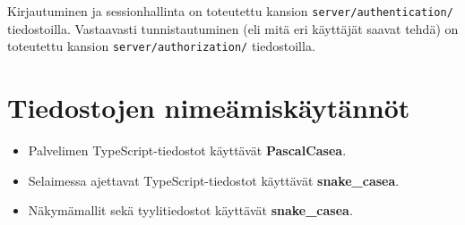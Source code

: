 Kirjautuminen ja sessionhallinta on toteutettu kansion \texttt{server/authentication/} tiedostoilla. Vastaavasti tunnistautuminen (eli mitä eri käyttäjät saavat tehdä) on toteutettu kansion \texttt{server/authorization/} tiedostoilla.
\newpage

\section{Tiedostojen nimeämiskäytännöt}
\begin{itemize}
	\item Palvelimen TypeScript-tiedostot käyttävät \textbf{PascalCasea}.
	\item Selaimessa ajettavat TypeScript-tiedostot käyttävät \textbf{snake\_casea}.
	\item Näkymämallit sekä tyylitiedostot käyttävät \textbf{snake\_casea}.
	
\end{itemize}
